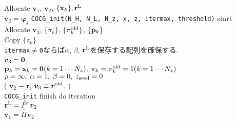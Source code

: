 \documentclass[12pt,titlepage]{jarticle}
\renewenvironment{leftbar}{%
  \def\FrameCommand{\vrule width 1pt \hspace{0pt}}%
  \MakeFramed {\advance\hsize-\width \FrameRestore}}%
 {\endMakeFramed}
\begin{document}
\noindent
Allocate ${\boldsymbol v}_1$, ${\boldsymbol v}_2$, $\{{\bf x}_k\}, {\bf r}^{\rm L}$
\\ 
${\boldsymbol v}_2 = {\boldsymbol \varphi_j}$
\vspace{-1em}
\begin{leftbar}
  \noindent
  \verb|COCG_init(N_H, N_L, N_z, x, z, itermax, threshold)| start
  \\ \hspace{0.5cm}
  Allocate ${\boldsymbol v}_3$, $\{\pi_k\}$, $\{\pi_k^{\rm old}\}$, $\{{\bf p}_k\}$
  \\ \hspace{0.5cm}
  Copy $\{z_k\}$
  \\ \hspace{0.5cm}
  \verb|itermax|$\neq$\verb|0|ならば$\alpha$, $\beta$, ${\bf r}^{\rm L}$を保存する配列を確保する.
  \\ \hspace{0.5cm}
  ${\boldsymbol v}_3 = {\bf 0}$,
  \\ \hspace{0.5cm}
  ${\bf p}_{k} = {\bf x}_k = {\bf 0}(k=1 \cdots N_z),\; \pi_k=\pi_k^{\rm old} = 1(k=1 \cdots N_z)$ 
  \\ \hspace{0.5cm}
  $\rho = \infty,\; \alpha = 1,\; \beta=0,\; z_{\rm seed}=0$ 
  \\ \hspace{0.5cm}
  (
  ${\boldsymbol v}_2 \equiv {\boldsymbol r}$, 
  ${\boldsymbol v}_3 \equiv {\boldsymbol r}^{\rm old}$. )
  \\
  \verb|COCG_init| finish
\end{leftbar}
\vspace{-1em}
\noindent
do iteration
\\\hspace{0.5cm}
${\bf r}^{\rm L} = {\hat P}^\dagger {\boldsymbol v}_2$
\\\hspace{0.5cm}
${\boldsymbol v}_1 = {\hat H} {\boldsymbol v}_2$
\vspace{-1em}
\end{document}
